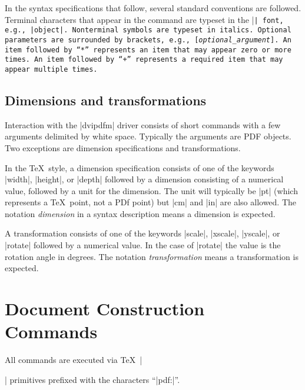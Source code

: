 {In the syntax specifications that follow, several
standard conventions are followed.  Terminal
characters that appear in the command 
are typeset in the |\tt| font, e.g., |object|.
Nonterminal symbols are typeset in italics.
Optional parameters are surrounded by brackets, e.g.,
[{\it optional\_argument}].  An item followed
by~``{*}'' represents an item that may appear
zero or more times.  An item followed by~``{+}''
represents a required item that may appear multiple times.

\subsection{Dimensions and transformations}
Interaction with the |dvipdfm| driver consists
of short commands with a few arguments delimited by white space.
Typically the arguments are PDF objects.
Two exceptions are dimension specifications and transformations.

In the \TeX\ style, a dimension specification consists of one of the keywords
|width|, |height|, or |depth| followed by a dimension
consisting of a numerical value, followed by a unit for the dimension.  The
unit will typically be |pt| (which represents a \TeX\ point, not a
PDf point) but |cm| and |in| are also allowed.  The notation
{\it dimension\/} in a syntax description means a dimension is expected.

A transformation consists of one of the keywords |scale|, |xscale|,
|yscale|, or |rotate| followed by a numerical value.  In the
case of |rotate| the value is the rotation angle in degrees.
The notation
{\it transformation} means a transformation is expected. 

\section{Document Construction Commands}
All commands are executed via \TeX\ |\special| primitives
prefixed with the characters ``|pdf:|''.
\example
\begintt
{}}
